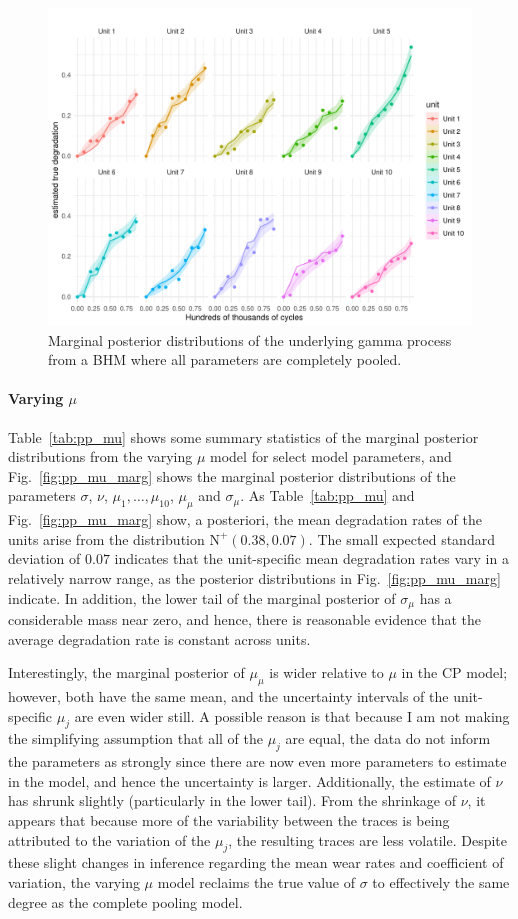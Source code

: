 

\begin{figure}
   \centering
   \includegraphics[width=0.8\columnwidth]{./figures/ch-5/plot-cp-filtered.pdf}
   \caption{Marginal posterior distributions of the underlying gamma process from a BHM where all parameters are completely pooled.}
   \label{fig:cp_filtered}
\end{figure}

\paragraph{Varying $\mu$} Table~\ref{tab:pp_mu} shows some summary statistics of the marginal posterior distributions from the varying $\mu$ model for select model parameters, and Fig.~\ref{fig:pp_mu_marg} shows the marginal posterior distributions of the parameters $\sigma$, $\nu$, $\mu_1, \ldots, \mu_{10}$, $\mu_{\mu}$ and $\sigma_{\mu}$. As Table~\ref{tab:pp_mu} and Fig.~\ref{fig:pp_mu_marg} show, a posteriori, the mean degradation rates of the units arise from the distribution $\mbox{N}^{+}(0.38, 0.07)$. The small expected standard deviation of $0.07$ indicates that the unit-specific mean degradation rates vary in a relatively narrow range, as the posterior distributions in Fig.~\ref{fig:pp_mu_marg} indicate. In addition, the lower tail of the marginal posterior of $\sigma_\mu$ has a considerable mass near zero, and hence, there is reasonable evidence that the average degradation rate is constant across units. 

Interestingly, the marginal posterior of $\mu_\mu$ is wider relative to $\mu$ in the CP model; however, both have the same mean, and the uncertainty intervals of the unit-specific $\mu_j$ are even wider still. A possible reason is that because I am not making the simplifying assumption that all of the $\mu_j$ are equal, the data do not inform the parameters as strongly since there are now even more parameters to estimate in the model, and hence the uncertainty is larger. Additionally, the estimate of $\nu$ has shrunk slightly (particularly in the lower tail). From the shrinkage of $\nu$, it appears that because more of the variability between the traces is being attributed to the variation of the $\mu_j$, the resulting traces are less volatile. Despite these slight changes in inference regarding the mean wear rates and coefficient of variation, the varying $\mu$ model reclaims the true value of $\sigma$ to effectively the same degree as the complete pooling model.


